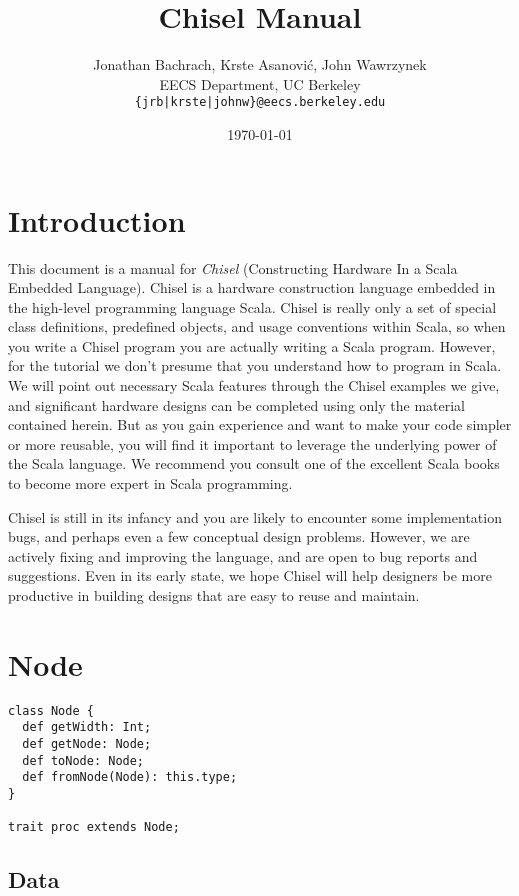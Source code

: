 \documentclass[10pt,twocolumn]{article}
\title{Chisel Manual}
\author{Jonathan Bachrach, Krste Asanovi\'{c}, John Wawrzynek \\
EECS Department, UC Berkeley\\
{\tt  \{jrb|krste|johnw\}@eecs.berkeley.edu}
}
\date{\today}
\begin{document}
\maketitle{}


\section{Introduction}

This document is a manual for {\em Chisel} (Constructing
Hardware In a Scala Embedded Language).  Chisel is a hardware
construction language embedded in the high-level programming language
Scala.  Chisel is really only a set of special class
definitions, predefined objects, and usage conventions within Scala,
so when you write a Chisel program you are actually writing a Scala
program.  However, for the tutorial we don't presume that you
understand how to program in Scala.  We will point out necessary Scala
features through the Chisel examples we give, and significant hardware
designs can be completed using only the material contained herein.
But as you gain experience and want to make your code simpler or more
reusable, you will find it important to leverage the underlying power
of the Scala language. We recommend you consult one of the excellent
Scala books to become more expert in Scala programming.

Chisel is still in its infancy and you are likely to encounter some
implementation bugs, and perhaps even a few conceptual design
problems.  However, we are actively fixing and improving the language,
and are open to bug reports and suggestions.  Even in its early state,
we hope Chisel will help designers be more productive in building
designs that are easy to reuse and maintain.

\section{Node}

\begin{verbatim}
class Node {
  def getWidth: Int;
  def getNode: Node;
  def toNode: Node;
  def fromNode(Node): this.type;
}

trait proc extends Node;
\end{verbatim}

\subsection{Data}
\end{document}

